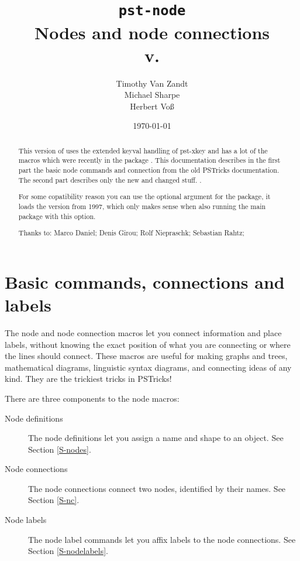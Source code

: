 \documentclass[11pt,english,BCOR10mm,DIV12,bibliography=totoc,parskip=false,smallheadings
    headexclude,footexclude,oneside]{pst-doc}
\let\pstFV\fileversion
\begin{document}
\title{\texttt{pst-node}\\Nodes and node connections%
\\\small v.\pstFV}
\author{Timothy Van Zandt\\Michael Sharpe\\Herbert Vo\ss}
\date{\today}

\maketitle

\begin{abstract}
This version of  uses the extended keyval handling
of pst-xkey and has a lot of the macros which were recently in
the package . This documentation describes in the first part
the basic node commands and connection from the old PSTricks documentation.
The second part describes only the
new and changed stuff. .

For some copatibility reason you can use the optional argument 
for the package, it loads the version from 1997, which only makes sense
when also running the main package  with this option.

\vfill
\noindent
Thanks to:  Marco Daniel; Denis Girou; Rolf Niepraschk; Sebastian Rahtz;
\end{abstract}

\clearpage
\tableofcontents

\clearpage
\part{Basic commands, connections and labels}

\leavevmode
{}%

The node and node connection macros let you connect information and place
labels, without knowing the exact position of what you are connecting or where
the lines should connect. These macros are useful for making graphs and trees,
mathematical diagrams, linguistic syntax diagrams, and connecting ideas of any
kind. They are the trickiest tricks in PSTricks!

There are three components to the node macros:
\begin{description}
  \item[Node definitions] The node definitions let you assign a name and shape
  to an object. See Section \ref{S-nodes}.
  \item[Node connections] The node connections connect two nodes, identified
  by their names. See Section \ref{S-nc}.
  \item[Node labels] The node label commands let you affix labels to the node
  connections. See Section \ref{S-nodelabels}.
\end{description}
\end{document}
